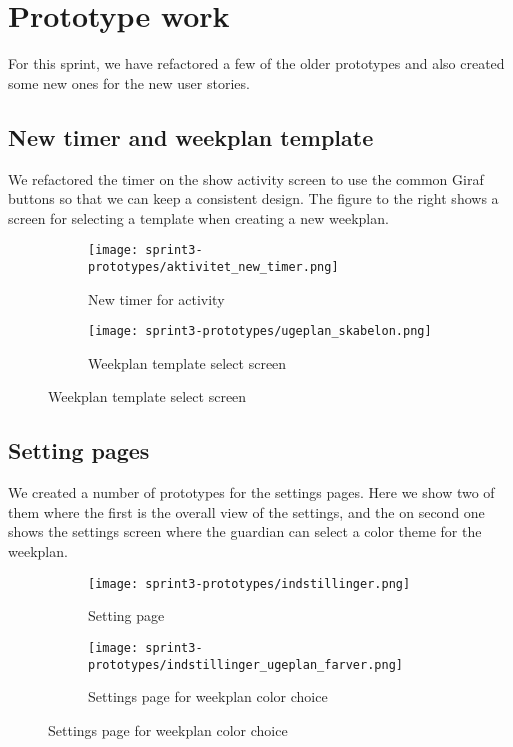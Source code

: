 \section{Prototype work}
For this sprint, we have refactored a few of the older prototypes and also created some new ones for the new user stories.

\subsection{New timer and weekplan template}
We refactored the timer on the show activity screen to use the common Giraf buttons so that we can keep a consistent design. The figure to the right shows a screen for selecting a template when creating a new weekplan.
\begin{figure}[H]
    \begin{subfigure}{0.5\textwidth}
    \texttt{[image: sprint3-prototypes/aktivitet\_new\_timer.png]} 
    \caption{New timer for activity}
    \label{fig:activity_new_timer}
    \end{subfigure}
    \begin{subfigure}{0.5\textwidth}
        \texttt{[image: sprint3-prototypes/ugeplan\_skabelon.png]}
    \caption{Weekplan template select screen}
    \label{fig:weekplan_template_screen}
    \end{subfigure} 
\end{figure}

\subsection{Setting pages}
We created a number of prototypes for the settings pages. Here we show two of them where the first is the overall view of the settings, and the on second one shows the settings screen where the guardian can select a color theme for the weekplan.
\begin{figure}[H]
    \begin{subfigure}{0.5\textwidth}
    \texttt{[image: sprint3-prototypes/indstillinger.png]} 
    \caption{Setting page}
    \label{fig:settings}
    \end{subfigure}
    \begin{subfigure}{0.5\textwidth}
        \texttt{[image: sprint3-prototypes/indstillinger\_ugeplan\_farver.png]}
    \caption{Settings page for weekplan color choice}
    \label{fig:settings_color_choice}
    \end{subfigure} 
\end{figure}

